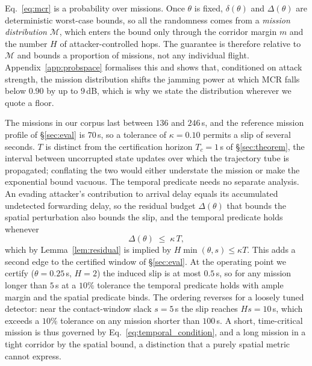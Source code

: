 \label{sec:probspace}
Eq.~\eqref{eq:mcr} is a probability over missions. Once $\theta$ is fixed,
$\delta(\theta)$ and $\Delta(\theta)$ are deterministic worst-case bounds, so
all the randomness comes from a \emph{mission distribution} $\mathcal{M}$, which
enters the bound only through the corridor margin $m$ and the number $H$ of
attacker-controlled hops. The guarantee is therefore relative to $\mathcal{M}$
and bounds a proportion of missions, not any individual flight.
Appendix~\ref{app:probspace} formalises this and shows that, conditioned on
attack strength, the mission distribution shifts the jamming power at which MCR
falls below $0.90$ by up to $9$\,dB, which is why we state the distribution
wherever we quote a floor.

The missions in our corpus last between $136$ and $246$\,s, and the reference
mission profile of \S\ref{sec:eval} is $70$\,s, so a tolerance of
$\kappa=0.10$ permits a slip of several seconds. $T$ is distinct from the
certification horizon $T_c=1$\,s of \S\ref{sec:theorem}, the interval between
uncorrupted state updates over which the trajectory tube is propagated;
conflating the two would either understate the mission or make the exponential
bound vacuous. The temporal predicate needs no separate analysis. An evading
attacker's contribution to arrival delay equals its accumulated undetected
forwarding delay, so the residual budget $\Delta(\theta)$ that bounds the
spatial perturbation also bounds the slip, and the temporal predicate holds
whenever
\begin{equation}
\label{eq:temporal_condition}
\Delta(\theta)\;\le\;\kappa\,T ,
\end{equation}
which by Lemma~\ref{lem:residual} is implied by $H\min(\theta,s)\le\kappa T$.
This adds a second edge to the certified window of \S\ref{sec:eval}. At the
operating point we certify ($\theta=0.25$\,s, $H=2$) the induced slip is at
most $0.5$\,s, so for any mission longer than $5$\,s at a $10\%$ tolerance the
temporal predicate holds with ample margin and the spatial predicate binds. The
ordering reverses for a loosely tuned detector: near the contact-window slack
$s=5$\,s the slip reaches $Hs=10$\,s, which exceeds a $10\%$ tolerance on any
mission shorter than $100$\,s. A short, time-critical mission is thus governed
by Eq.~\eqref{eq:temporal_condition}, and a long mission in a tight corridor by
the spatial bound, a distinction that a purely spatial metric cannot express.


